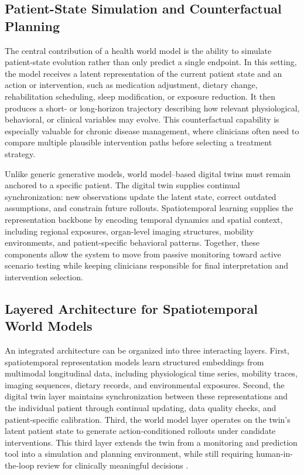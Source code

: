 \documentclass[acmsmall]{acmart}
\begin{document}
\subsection{Patient-State Simulation and Counterfactual Planning}
The central contribution of a health world model is the ability to simulate patient-state evolution rather than only predict a single endpoint. In this setting, the model receives a latent representation of the current patient state and an action or intervention, such as medication adjustment, dietary change, rehabilitation scheduling, sleep modification, or exposure reduction. It then produces a short- or long-horizon trajectory describing how relevant physiological, behavioral, or clinical variables may evolve. This counterfactual capability is especially valuable for chronic disease management, where clinicians often need to compare multiple plausible intervention paths before selecting a treatment strategy.

Unlike generic generative models, world model--based digital twins must remain anchored to a specific patient. The digital twin supplies continual synchronization: new observations update the latent state, correct outdated assumptions, and constrain future rollouts. Spatiotemporal learning supplies the representation backbone by encoding temporal dynamics and spatial context, including regional exposures, organ-level imaging structures, mobility environments, and patient-specific behavioral patterns. Together, these components allow the system to move from passive monitoring toward active scenario testing while keeping clinicians responsible for final interpretation and intervention selection.

\subsection{Layered Architecture for Spatiotemporal World Models}
An integrated architecture can be organized into three interacting layers. First, spatiotemporal representation models learn structured embeddings from multimodal longitudinal data, including physiological time series, mobility traces, imaging sequences, dietary records, and environmental exposures. Second, the digital twin layer maintains synchronization between these representations and the individual patient through continual updating, data quality checks, and patient-specific calibration. Third, the world model layer operates on the twin's latent patient state to generate action-conditioned rollouts under candidate interventions. This third layer extends the twin from a monitoring and prediction tool into a simulation and planning environment, while still requiring human-in-the-loop review for clinically meaningful decisions \cite{Sadee2025MedicalDT}.
\end{document}
